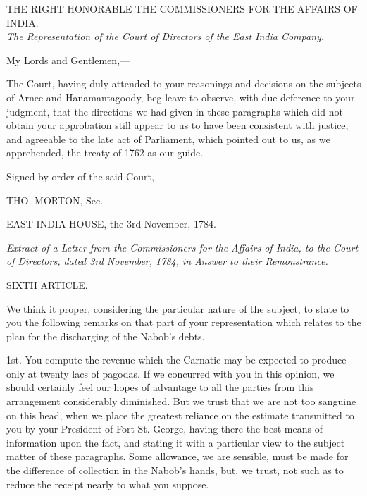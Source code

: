 \PRLsep
\begin{center}
  THE RIGHT HONORABLE THE COMMISSIONERS FOR THE AFFAIRS OF INDIA.
  \\ \textit{The Representation of the Court of Directors of the East India Company.}
\par
\end{center}

\noindent
My Lords and Gentlemen,—

The Court, having duly attended to your reasonings and decisions on the subjects of Arnee and Hanamantagoody, beg leave to observe, with due deference to your judgment, that the directions we had given in these paragraphs which did not obtain your approbation still appear to us to have been consistent with justice, and agreeable to the late act of Parliament, which pointed out to us, as we apprehended, the treaty of 1762 as our guide.

\hspace{1in}Signed by order of the said Court,

\hspace{3in}THO. MORTON, Sec.

EAST INDIA HOUSE, the 3rd November, 1784.

\PRLsep

\textit{Extract of a Letter from the Commissioners for the Affairs of India, to the Court of Directors, dated 3rd November, 1784, in Answer to their Remonstrance.}

\centerline{SIXTH ARTICLE.}

We think it proper, considering the particular nature of the subject, to state to you the following remarks on that part of your representation which relates to the plan for the discharging of the Nabob's debts.

1st. You compute the revenue which the Carnatic may be expected to produce only at twenty lacs of pagodas. If we concurred with you in this opinion, we should certainly feel our hopes of advantage to all the parties from this arrangement considerably diminished. But we trust that we are not too sanguine on this head, when we place the greatest reliance on the estimate transmitted to you by your President of Fort St. George, having there the best means of information upon the fact, and stating it with a particular view to the subject matter of these paragraphs. Some allowance, we are sensible, must be made for the difference of collection in the Nabob's hands, but, we trust, not such as to reduce the receipt nearly to what you suppose.

